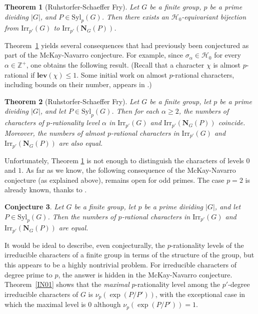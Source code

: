 \documentclass[12pt]{amsart}
\newtheorem{theorem}{Theorem}[section]
\newtheorem{conjecture}[theorem]{Conjecture}
\theoremstyle{definition}
\numberwithin{equation}{section}
\newcommand{\Irr}{{\mathrm {Irr}}}
\newcommand{\Syl}{{\mathrm {Syl}}}
\newcommand{\lev}{\mathrm{\mathbf{lev}}}
\newcommand{\bN}{{\mathbf{N}}}
\begin{document}
\begin{theorem}[Ruhstorfer-Schaeffer Fry]\label{thm:RSF}
Let $G$ be a finite group, $p$ be a prime dividing $|G|$, and
$P\in\Syl_p(G)$. Then there exists an $\mathcal{H}_0$-equivariant
bijection from $\Irr_{p'}(G)$ to $\Irr_{p'}(\bN_G(P))$.
\end{theorem}

Theorem~\ref{thm:RSF} yields several consequences that had
previously been conjectured as part of the McKay-Navarro conjecture.
For example, since $\sigma_{\alpha} \in \mathcal{H}_0$ for every
$\alpha \in \mathbb{Z}^{+}$, one obtains the following result.
(Recall that a character $\chi$ is almost $p$-rational if
$\lev(\chi) \le 1$. Some initial work on almost $p$-rational
characters, including bounds on their number, appears in
\cite{Hung-Malle-Maroti21}.)

\begin{theorem}[Ruhstorfer-Schaeffer Fry]\label{thm:RSF2}
Let $G$ be a finite group, let $p$ be a prime dividing $|G|$, and
let $P\in\Syl_p(G)$. Then for each $\alpha\geq 2$, the numbers of
characters of $p$-rationality level $\alpha$ in $\Irr_{p'}(G)$ and
$\Irr_{p'}(\bN_G(P))$ coincide. Moreover, the numbers of almost
$p$-rational characters in $\Irr_{p'}(G)$ and $\Irr_{p'}(\bN_G(P))$
are also equal.
\end{theorem}

Unfortunately, Theorem \ref{thm:RSF} is not enough to distinguish
the characters of levels $0$ and $1$. As far as we know, the
following consequence of the McKay-Navarro conjecture (as explained
above), remains open for odd primes. The case $p=2$ is already
known, thanks to \cite{RS25a}.

\begin{conjecture}
Let $G$ be a finite group, let $p$ be a prime dividing $|G|$, and
let $P\in\Syl_p(G)$. Then the numbers of $p$-rational characters in
$\Irr_{p'}(G)$ and $\Irr_{p'}(\bN_G(P))$ are equal.
\end{conjecture}


It would be ideal to describe, even conjecturally, the
$p$-rationality levels of the irreducible characters of a finite
group in terms of the structure of the group, but this appears to be
a highly nontrivial problem. For irreducible characters of degree
prime to $p$, the answer is hidden in the McKay-Navarro conjecture.
Theorem~\ref{IN01} shows that the \emph{maximal} $p$-rationality
level among the $p'$-degree irreducible characters of $G$ is
$\nu_p(\exp(P/P'))$, with the exceptional case in which the maximal
level is $0$ although $\nu_p(\exp(P/P')) = 1$.
\end{document}
